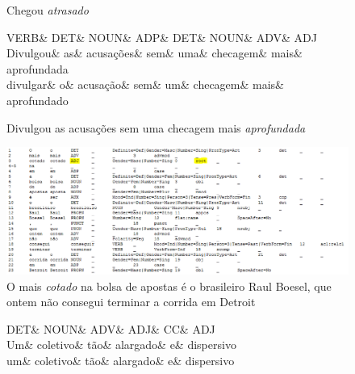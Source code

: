 \documentclass[output=paper,colorlinks,citecolor=brown]{langscibook}
\begin{document}
\begin{enumerate}
\begin{figure}[H]
\begin{dependency}
				\end{dependency}
				\caption{Chegou \emph{atrasado}}
				\label{fig:partDIF9}
			\end{figure}

		\begin{figure}[H]
				\centering
				\vspace{.8cm}
				\begin{dependency}
					\begin{deptext}
						VERB\& DET\& NOUN\& ADP\& DET\& NOUN\& ADV\& ADJ\\
						Divulgou\& as\& acusações\& sem\& uma\& checagem\& mais\& aprofundada\\
						divulgar\& o\& acusação\& sem\& um\& checagem\& mais\& aprofundado\\
					\end{deptext}
					
				\end{dependency}
				\caption{Divulgou as acusações sem uma checagem mais \emph{aprofundada}}
				\label{fig:partDIF2}
			\end{figure}

			\begin{figure}[H]
			\centering
			\includegraphics[width=\textwidth,height=\textheight,keepaspectratio]{imagesDrive/image19.png}
			\caption{O mais \emph{cotado} na bolsa de apostas é o brasileiro Raul Boesel, que ontem não consegui terminar a corrida em Detroit}	
			\label{fig:partDIF3}
		\end{figure}
			
			\begin{figure}[H]
			\centering
			\vspace{.8cm}
			\begin{dependency}
				\begin{deptext}
					DET\& NOUN\& ADV\& ADJ\& CC\& ADJ\\
					Um\& coletivo\& tão\& alargado\& e\& dispersivo\\
					um\& coletivo\& tão\& alargado\& e\& dispersivo\\
				\end{deptext}
				

\end{dependency}
\end{figure}
\end{enumerate}
\end{document}
